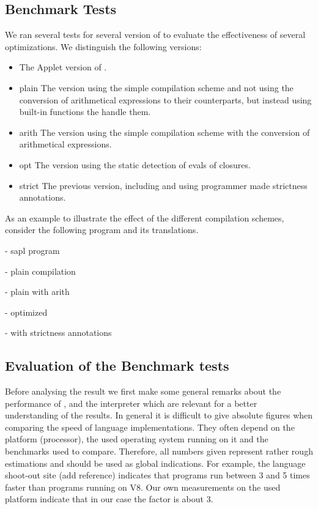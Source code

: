 \subsection{Benchmark Tests}
We ran several tests for several version of \Sapljs to evaluate the effectiveness of several
optimizations. 
We distinguish the following versions:
\begin{itemize}
\item{\Sapl} The \Java Applet version of \Sapl.
\item{\Sapljs plain} The  version using the simple compilation scheme and not using the conversion of arithmetical expressions 
to their \JS counterparts, but instead using built-in functions the handle them. 
\item{\Sapljs arith} The version using the simple compilation scheme with the conversion of arithmetical expressions.
\item{\Sapljs opt} The version using the static detection of evals of closures.
\item{\Sapljs strict} The previous version, including and using programmer made strictness annotations.
\end{itemize}

As an example to illustrate the effect of the different compilation schemes, consider the following \Sapl program and its translations.

- sapl program

- plain compilation

- plain with arith

- optimized

- with strictness annotations


%

\subsection{Evaluation of the Benchmark tests}
Before analysing the result we first make some general remarks about the performance of \Java, \JS and the \Sapl interpreter which are relevant for
a better understanding of the results. In general it is difficult to give absolute figures when comparing the speed of language implementations. 
They often depend on the platform (processor), the used operating system running on it and the benchmarks used to compare. 
Therefore, all numbers given represent rather rough estimations and should be used as global indications. 
For example, the language shoot-out site (add reference) indicates that \Java 
programs run between 3 and 5 times faster than \JS programs running on V8. 
Our own measurements on the used platform indicate that in our case the factor is about 3.

